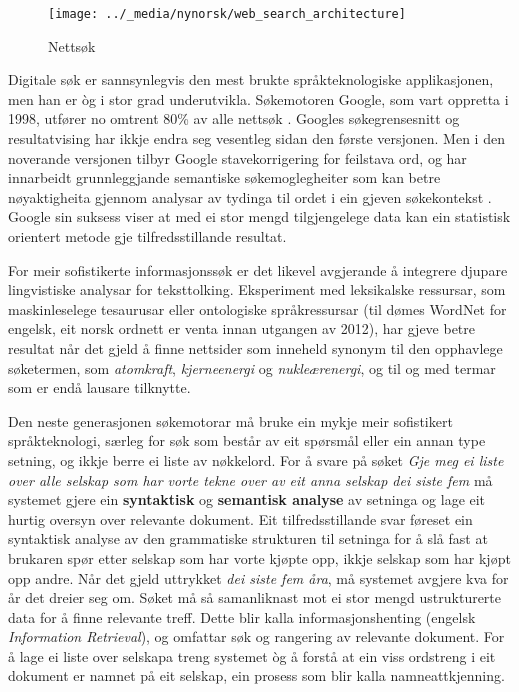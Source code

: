 \begin{multicols}{2}
\begin{figure*}[htb]
  \center
  \texttt{[image: ../\_media/nynorsk/web\_search\_architecture]}
  \caption{Nettsøk}
  \label{fig:websearcharch_no}
 \end{figure*}

Digitale søk er sannsynlegvis den mest brukte språkteknologiske applikasjonen, men han er òg i stor grad underutvikla. Søkemotoren Google, som vart oppretta i 1998, utfører no omtrent 80\% av alle nettsøk \cite{spi1}. 
Googles søkegrensesnitt og resultatvising har ikkje endra seg vesentleg sidan den første versjonen. Men i den noverande versjonen tilbyr Google stavekorrigering for feilstava ord, og har innarbeidt grunnleggjande semantiske søkemoglegheiter som kan betre nøyaktigheita gjennom analysar av tydinga til ordet i ein gjeven søkekontekst \cite{pc1}. Google sin suksess viser at med ei stor mengd tilgjengelege data kan ein statistisk orientert metode gje tilfredsstillande resultat. 

For meir sofistikerte informasjonssøk er det likevel avgjerande å integrere djupare lingvistiske analysar for teksttolking. Eksperiment med leksikalske ressursar, som maskinleselege tesaurusar eller ontologiske språkressursar (til dømes WordNet for engelsk, eit norsk ordnett er venta innan utgangen av 2012), har gjeve betre resultat når det gjeld å finne nettsider som inneheld synonym til den opphavlege søketermen, som
\textit{atomkraft}, \textit{kjerneenergi} og \textit{nukleærenergi}, og til og med termar som er endå lausare tilknytte.  


Den neste generasjonen søkemotorar må bruke ein mykje meir sofistikert språkteknologi, særleg for søk som består av eit spørsmål eller ein annan type setning, og ikkje berre ei liste av nøkkelord. For å svare på søket \textit{Gje meg ei liste over alle selskap som har vorte tekne over av eit anna selskap dei siste fem} må systemet gjere ein \textbf{syntaktisk} og \textbf{semantisk analyse} av setninga og lage eit hurtig oversyn over relevante dokument. Eit tilfredsstillande svar føreset ein syntaktisk analyse av den grammatiske strukturen til setninga for å slå fast at brukaren spør etter selskap som har vorte kjøpte opp, ikkje selskap som har kjøpt opp andre. Når det gjeld uttrykket \textit{dei siste fem åra}, må systemet avgjere kva for år det dreier seg om. Søket må så samanliknast mot ei stor mengd ustrukturerte data for å finne relevante treff. Dette blir kalla informasjonshenting (engelsk \textit{Information Retrieval}), og omfattar søk og rangering av relevante dokument. For å lage ei liste over selskapa treng systemet òg å forstå at ein viss ordstreng i eit dokument er namnet på eit selskap, ein prosess som blir kalla namneattkjenning. 


\end{multicols}
